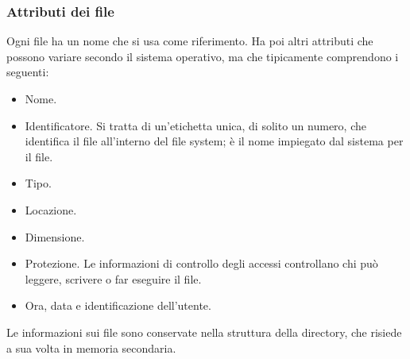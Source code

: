 \documentclass[11pt,a4paper]{article}
\begin{document}
{\subsubsection{Attributi dei file}
Ogni file ha un nome che si usa come riferimento. Ha poi altri attributi che possono variare secondo il sistema operativo, ma che tipi­camente comprendono i seguenti:
\begin{itemize}
  \item Nome.
  \item Identificatore. Si tratta di un'etichetta unica, di solito un numero, che identifica il file all'interno del file system; è il nome impiegato dal sistema per il file.
  \item Tipo.
  \item Locazione.
  \item Dimensione.
  \item Protezione. Le informazioni di controllo degli accessi controllano chi può leggere, scrivere o far eseguire il file.
  \item Ora, data e identificazione dell'utente.
\end{itemize}
Le informazioni sui file sono conservate nella struttura della directory, che risiede a sua vol­ta in memoria secondaria.

}
\end{document}
